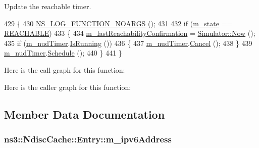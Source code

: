 Update the reachable timer. 


\begin{DoxyCode}
429 \{
430   \hyperlink{log-macros-disabled_8h_a8f7e4afc291c9d29a65c18ac1f79197b}{NS\_LOG\_FUNCTION\_NOARGS} ();
431 
432   \textcolor{keywordflow}{if} (\hyperlink{classns3_1_1NdiscCache_1_1Entry_a0f23b2879c9ba4228b48eed507bbe8f8}{m\_state} == \hyperlink{classns3_1_1NdiscCache_1_1Entry_a18d0994b494f15432f9e02da84c69defa23693cb2cf292e77b921b74edb0fa5b5}{REACHABLE})
433     \{
434       \hyperlink{classns3_1_1NdiscCache_1_1Entry_a68efcbbc4f8553d5a962b23fea1a2da4}{m\_lastReachabilityConfirmation} = 
      \hyperlink{classns3_1_1Simulator_ac3178fa975b419f7875e7105be122800}{Simulator::Now} ();
435       \textcolor{keywordflow}{if} (\hyperlink{classns3_1_1NdiscCache_1_1Entry_ad81790b631a991bdecc6d9ff4d86ad9d}{m\_nudTimer}.\hyperlink{classns3_1_1Timer_addbc6c740f21ddeb6ad358557962b24c}{IsRunning} ())
436         \{
437           \hyperlink{classns3_1_1NdiscCache_1_1Entry_ad81790b631a991bdecc6d9ff4d86ad9d}{m\_nudTimer}.\hyperlink{classns3_1_1Timer_ac8261489cfc3361ab869ea2387cfc841}{Cancel} ();
438         \}
439       \hyperlink{classns3_1_1NdiscCache_1_1Entry_ad81790b631a991bdecc6d9ff4d86ad9d}{m\_nudTimer}.\hyperlink{classns3_1_1Timer_ac3345d696887578f518b19f359f7f94b}{Schedule} ();
440     \}
441 \}
\end{DoxyCode}


Here is the call graph for this function\+:




Here is the caller graph for this function\+:




\subsection{Member Data Documentation}
\subsubsection[{\texorpdfstring{m\+\_\+ipv6\+Address}{m_ipv6Address}}]{ ns3\+::\+Ndisc\+Cache\+::\+Entry\+::m\+\_\+ipv6\+Address\hspace{0.3cm}{\ttfamily [private]}}\hypertarget{classns3_1_1NdiscCache_1_1Entry_a3898a5f2de13afc888a20af7f10908a4}{}\label{classns3_1_1NdiscCache_1_1Entry_a3898a5f2de13afc888a20af7f10908a4}


